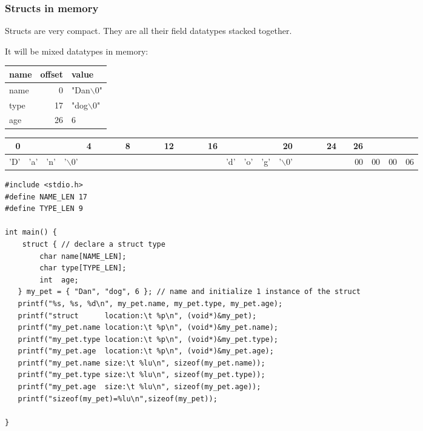 \documentclass[11pt]{article}
\begin{document}
\subsubsection{Structs in memory}
\label{sec:orge315619}

Structs are very compact. They are all their field datatypes stacked
together.

It will be mixed datatypes in memory:

\begin{center}
\begin{tabular}{lrl}
name & offset & value\\
\hline
name & 0 & "Dan$\backslash$0"\\
type & 17 & "dog$\backslash$0"\\
age & 26 & 6\\
\end{tabular}
\end{center}

\begin{center}
\begin{tabular}{rlllrlllrlllrlllrlllrlllrlrrrr}
0 &  &  &  & 4 &  &  &  & 8 &  &  &  & 12 &  &  &  & 16 &  &  &  & 20 &  &  &  & 24 &  & 26 &  &  & \\
\hline
'D' & 'a' & 'n' & '$\backslash$0' &  &  &  &  &  &  &  &  &  &  &  &  &  & 'd' & 'o' & 'g' & '$\backslash$0' &  &  &  &  &  & 00 & 00 & 00 & 06\\
\end{tabular}
\end{center}


\begin{verbatim}
#include <stdio.h>
#define NAME_LEN 17
#define TYPE_LEN 9

int main() {
    struct { // declare a struct type
        char name[NAME_LEN];
        char type[TYPE_LEN];
        int  age;
   } my_pet = { "Dan", "dog", 6 }; // name and initialize 1 instance of the struct
   printf("%s, %s, %d\n", my_pet.name, my_pet.type, my_pet.age);
   printf("struct      location:\t %p\n", (void*)&my_pet);
   printf("my_pet.name location:\t %p\n", (void*)&my_pet.name);
   printf("my_pet.type location:\t %p\n", (void*)&my_pet.type);
   printf("my_pet.age  location:\t %p\n", (void*)&my_pet.age);
   printf("my_pet.name size:\t %lu\n", sizeof(my_pet.name));
   printf("my_pet.type size:\t %lu\n", sizeof(my_pet.type));
   printf("my_pet.age  size:\t %lu\n", sizeof(my_pet.age));
   printf("sizeof(my_pet)=%lu\n",sizeof(my_pet));

}
\end{verbatim}
\end{document}
